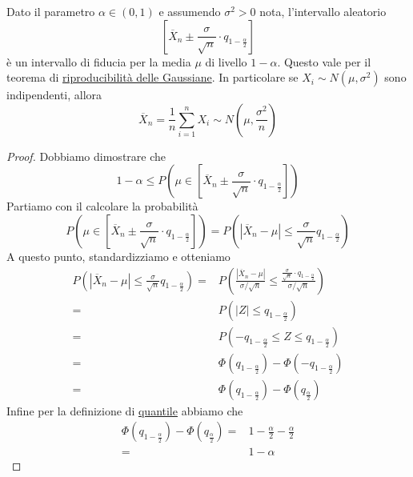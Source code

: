 \begin{proposition}
	Dato il parametro $\alpha \in (0,1)$ e assumendo $\sigma^2 > 0$ nota, l'intervallo aleatorio
	\[
		\left[ \overline{X}_n \pm \frac{\sigma}{\sqrt{n}} \cdot q_{1 - \frac{\alpha}{2}} \right]
	\]
	è un intervallo di fiducia per la media $\mu$ di livello $1 - \alpha$. Questo vale per il
	teorema di \hyperref[prop: riprod_gauss]{riproducibilità delle Gaussiane}. In particolare se
	$X_i \sim N(\mu, \sigma^2)$ sono indipendenti, allora
	\[
		\overline{X}_n = \frac{1}{n} \sum_{i=1}^n X_i \sim
		N \left( \mu, \frac{\sigma^2}{n} \right)
	\]
	\begin{proof}
		Dobbiamo dimostrare che
		\[
			1 - \alpha \leq P \left( \mu \in \left[ \overline{X}_n \pm
				\frac{\sigma}{\sqrt{n}} \cdot q_{1-\frac{\alpha}{2}} \right] \right)
		\]
		Partiamo con il calcolare la probabilità
		\[
			P \left( \mu \in \left[ \overline{X}_n \pm
				\frac{\sigma}{\sqrt{n}} \cdot q_{1-\frac{\alpha}{2}} \right] \right) =
			P \left( \left| \overline{X}_n - \mu \right| \leq
			\frac{\sigma}{\sqrt{n}} q_{1 - \frac{\alpha}{2}} \right)
		\]
		A questo punto, standardizziamo e otteniamo
		\begin{align*}
			P \left( |\overline{X}_n - \mu| \leq
			\frac{\sigma}{\sqrt{n}} q_{1 - \frac{\alpha}{2}} \right) = &
			P \left( \frac{|\overline{X}_n - \mu|}{\sigma / \sqrt{n}} \leq
			\frac{\frac{\sigma}{\sqrt{n}} \cdot q_{1-\frac{\alpha}{2}}}{\sigma/\sqrt{n}} \right) \\
			=                                                          &
			P \left( |Z| \leq q_{1 - \frac{\alpha}{2}} \right)                                   \\
			=                                                          &
			P \left( -q_{1 - \frac{\alpha}{2}} \leq Z \leq q_{1-\frac{\alpha}{2}} \right)        \\
			=                                                          &
			\Phi \left( q_{1-\frac{\alpha}{2}} \right) -
			\Phi \left(-q_{1-\frac{\alpha}{2}} \right)                                           \\
			=                                                          &
			\Phi \left( q_{1-\frac{\alpha}{2}} \right) -
			\Phi \left(q_{\frac{\alpha}{2}} \right)
		\end{align*}
		Infine per la definizione di \hyperref[def: quantile]{quantile} abbiamo che
		\begin{align*}
			\Phi \left( q_{1-\frac{\alpha}{2}} \right) -
			\Phi \left(q_{\frac{\alpha}{2}} \right) = & 1 - \frac{\alpha}{2} -
			\frac{\alpha}{2}                                                   \\
			=                                         & 1 - \alpha
		\end{align*}
	\end{proof}
\end{proposition}

